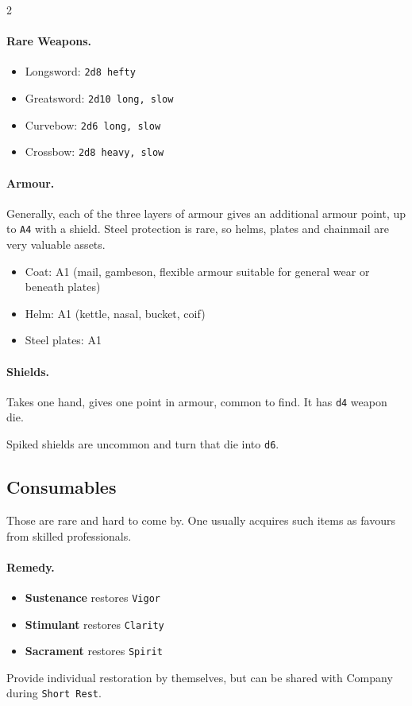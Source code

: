 \begin{multicols*}{2}
\paragraph{Rare Weapons.}
\begin{itemize}[nosep, leftmargin=*]
    \item [$\bullet$] Longsword: \texttt{2d8 hefty}
    \item [$\bullet$] Greatsword: \texttt{2d10 long, slow}
    \item [$\bullet$] Curvebow: \texttt{2d6 long, slow}
    \item [$\bullet$] Crossbow: \texttt{2d8 heavy, slow}
\end{itemize}

\paragraph{Armour.} Generally, each of the three layers of armour gives an additional armour point, up to \texttt{A4} with a shield.
Steel protection is rare, so helms, plates and chainmail are very valuable assets.
\begin{itemize}[nosep, leftmargin=*]
    \item[\ding{56}] Coat: A1 (mail, gambeson, flexible armour suitable for general wear or beneath plates)
    \item[\ding{56}] Helm: A1 (kettle, nasal, bucket, coif)
    \item[\ding{56}] Steel plates: A1 
\end{itemize}

\paragraph{Shields.} Takes one hand, gives one point in armour, common to find. It has \texttt{d4} weapon die.

Spiked shields are uncommon and turn that die into \texttt{d6}.

\subsection*{Consumables}

Those are rare and hard to come by. One usually acquires such items as favours from skilled professionals.

\paragraph{Remedy.}
\begin{itemize}[nosep, leftmargin=*]
    \item[\ding{60}] \textbf{Sustenance} restores \texttt{Vigor}
    \item[\ding{60}] \textbf{Stimulant} restores \texttt{Clarity}
    \item[\ding{60}] \textbf{Sacrament} restores \texttt{Spirit}
\end{itemize} 
Provide individual restoration by themselves, but can be shared with Company during \texttt{Short Rest}.


\end{multicols*}
